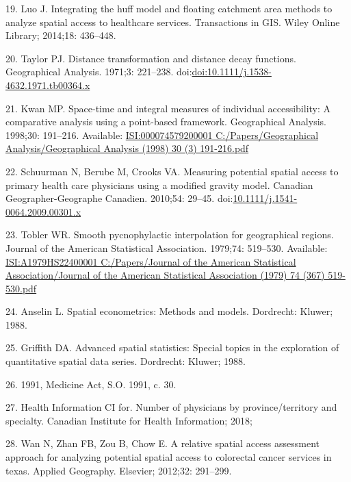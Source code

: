 \documentclass[10pt,letterpaper]{article}
\begin{document}
\hypertarget{ref-Luo2014}{}
19. Luo J. Integrating the huff model and floating catchment area
methods to analyze spatial access to healthcare services. Transactions
in GIS. Wiley Online Library; 2014;18: 436--448.

\hypertarget{ref-Taylor1971}{}
20. Taylor PJ. Distance transformation and distance decay functions.
Geographical Analysis. 1971;3: 221--238.
doi:\href{https://doi.org/doi:10.1111/j.1538-4632.1971.tb00364.x}{doi:10.1111/j.1538-4632.1971.tb00364.x}

\hypertarget{ref-Kwan1998}{}
21. Kwan MP. Space-time and integral measures of individual
accessibility: A comparative analysis using a point-based framework.
Geographical Analysis. 1998;30: 191--216. Available:
\href{ISI:000074579200001\%0AC:/Papers/Geographical\%20Analysis/Geographical\%20Analysis\%20(1998)\%2030\%20(3)\%20191-216.pdf}{ISI:000074579200001
C:/Papers/Geographical Analysis/Geographical Analysis (1998) 30 (3) 191-216.pdf}

\hypertarget{ref-Schuurman2010}{}
22. Schuurman N, Berube M, Crooks VA. Measuring potential spatial access
to primary health care physicians using a modified gravity model.
Canadian Geographer-Geographe Canadien. 2010;54: 29--45.
doi:\href{https://doi.org/10.1111/j.1541-0064.2009.00301.x}{10.1111/j.1541-0064.2009.00301.x}

\hypertarget{ref-Tobler1979}{}
23. Tobler WR. Smooth pycnophylactic interpolation for geographical
regions. Journal of the American Statistical Association. 1979;74:
519--530. Available:
\href{ISI:A1979HS22400001\%0AC:/Papers/Journal\%20of\%20the\%20American\%20Statistical\%20Association/Journal\%20of\%20the\%20American\%20Statistical\%20Association\%20(1979)\%2074\%20(367)\%20519-530.pdf}{ISI:A1979HS22400001
C:/Papers/Journal of the American Statistical Association/Journal of the American Statistical Association (1979) 74 (367) 519-530.pdf}

\hypertarget{ref-Anselin1988}{}
24. Anselin L. Spatial econometrics: Methods and models. Dordrecht:
Kluwer; 1988.

\hypertarget{ref-Griffith1988}{}
25. Griffith DA. Advanced spatial statistics: Special topics in the
exploration of quantitative spatial data series. Dordrecht: Kluwer;
1988.

\hypertarget{ref-Ontario1991}{}
26. 1991, Medicine Act, S.O. 1991, c. 30.

\hypertarget{ref-CIHI2018}{}
27. Health Information CI for. Number of physicians by
province/territory and specialty. Canadian Institute for Health
Information; 2018;

\hypertarget{ref-Wan2012SPAR}{}
28. Wan N, Zhan FB, Zou B, Chow E. A relative spatial access assessment
approach for analyzing potential spatial access to colorectal cancer
services in texas. Applied Geography. Elsevier; 2012;32: 291--299.

\nolinenumbers
\end{document}
